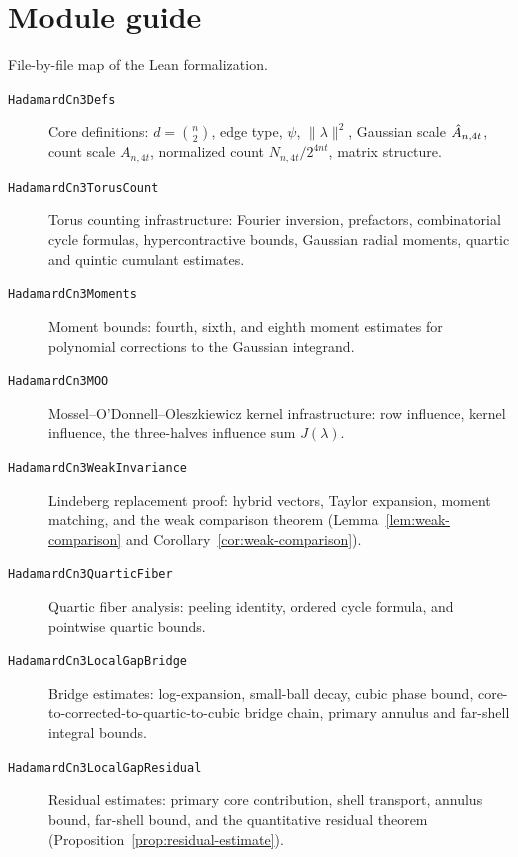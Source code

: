 \chapter{Module guide}
\label{chap:modules}

File-by-file map of the Lean formalization.

\begin{description}
\item[\texttt{HadamardCn3Defs}]
  Core definitions: $d=\binom{n}{2}$, edge type, $\psi$, $\|\lambda\|^2$,
  Gaussian scale $\hat A_{n,4t}$, count scale $A_{n,4t}$, normalized count
  $N_{n,4t}/2^{4nt}$, matrix structure.

\item[\texttt{HadamardCn3TorusCount}]
  Torus counting infrastructure: Fourier inversion, prefactors,
  combinatorial cycle formulas, hypercontractive bounds, Gaussian
  radial moments, quartic and quintic cumulant estimates.

\item[\texttt{HadamardCn3Moments}]
  Moment bounds: fourth, sixth, and eighth moment estimates for
  polynomial corrections to the Gaussian integrand.

\item[\texttt{HadamardCn3MOO}]
  Mossel--O'Donnell--Oleszkiewicz kernel infrastructure: row influence,
  kernel influence, the three-halves influence sum $J(\lambda)$.

\item[\texttt{HadamardCn3WeakInvariance}]
  Lindeberg replacement proof: hybrid vectors, Taylor expansion,
  moment matching, and the weak comparison theorem
  (Lemma~\ref{lem:weak-comparison} and Corollary~\ref{cor:weak-comparison}).

\item[\texttt{HadamardCn3QuarticFiber}]
  Quartic fiber analysis: peeling identity, ordered cycle formula,
  and pointwise quartic bounds.

\item[\texttt{HadamardCn3LocalGapBridge}]
  Bridge estimates: log-expansion, small-ball decay, cubic phase bound,
  core-to-corrected-to-quartic-to-cubic bridge chain, primary annulus
  and far-shell integral bounds.

\item[\texttt{HadamardCn3LocalGapResidual}]
  Residual estimates: primary core contribution, shell transport,
  annulus bound, far-shell bound, and the quantitative residual theorem
  (Proposition~\ref{prop:residual-estimate}).


\end{description}
